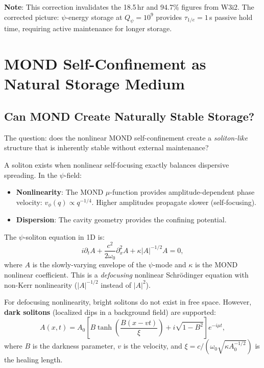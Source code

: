 \documentclass[11pt]{article}
\theoremstyle{definition}
\theoremstyle{remark}
\newcommand{\Qpsi}{Q_\psi}
\begin{document}
\textbf{Note}: This correction invalidates the 18.5\,hr and 94.7\%
figures from W3i2. The corrected picture: $\psi$-energy storage at
$\Qpsi = 10^9$ provides $\tau_{1/e} = 1$\,s passive hold time,
requiring active maintenance for longer storage.

\section{MOND Self-Confinement as Natural Storage Medium}
\label{sec:mond-natural}

\subsection{Can MOND Create Naturally Stable Storage?}

The question: does the nonlinear MOND self-confinement create a
\emph{soliton-like} structure that is inherently stable without
external maintenance?

A soliton exists when nonlinear self-focusing exactly balances
dispersive spreading. In the $\psi$-field:
\begin{itemize}
\item \textbf{Nonlinearity}: The MOND $\mu$-function provides
amplitude-dependent phase velocity: $v_\phi(q) \propto q^{-1/4}$.
Higher amplitudes propagate slower (self-focusing).
\item \textbf{Dispersion}: The cavity geometry provides the confining
potential.
\end{itemize}

The $\psi$-soliton equation in 1D is:
\begin{equation}
i\partial_t A + \frac{c^2}{2\omega_0}\partial_x^2 A
+ \kappa |A|^{-1/2} A = 0,
\label{eq:soliton}
\end{equation}
where $A$ is the slowly-varying envelope of the $\psi$-mode and
$\kappa$ is the MOND nonlinear coefficient. This is a
\emph{defocusing} nonlinear Schr\"odinger equation with non-Kerr
nonlinearity ($|A|^{-1/2}$ instead of $|A|^2$).

For defocusing nonlinearity, bright solitons do not exist in free
space. However, \textbf{dark solitons} (localized dips in a
background field) are supported:
\begin{equation}
A(x,t) = A_0 \left[B \tanh\!\left(\frac{B(x - vt)}{\xi}\right)
+ i\sqrt{1 - B^2}\right] e^{-i\mu t},
\end{equation}
where $B$ is the darkness parameter, $v$ is the velocity, and
$\xi = c / (\omega_0 \sqrt{\kappa A_0^{-1/2}})$ is the healing length.
\end{document}
